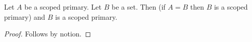 

\begin{proposition}\label{horn_scoped_equality_missing}
    Let $A$ be a scoped primary.
    Let $B$ be a set.
    Then (if $A=B$ then $B$ is a scoped primary) and $B$ is a scoped primary.
\end{proposition}
\begin{proof}
    Follows by notion.
\end{proof}
